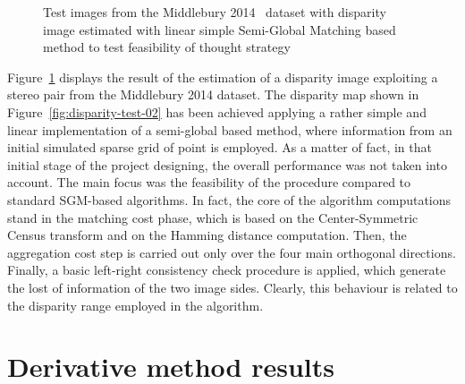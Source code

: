 \begin{figure}[t]
	\centering
\caption{Test images from the Middlebury 2014~\cite{Scharstein2014} dataset with disparity image estimated with linear simple Semi-Global Matching based method to test feasibility of thought strategy}
\label{fig:test-matlab-02}
\end{figure}

Figure~\ref{fig:test-matlab-02} displays the result of the estimation of a disparity image exploiting a stereo pair from the Middlebury 2014 dataset.
The disparity map shown in Figure~\ref{fig:disparity-test-02} has been achieved applying a rather simple and linear implementation of a semi-global based method, where information from an initial simulated sparse grid of point is employed.
As a matter of fact, in that initial stage of the project designing, the overall performance was not taken into account.
The main focus was the feasibility of the procedure compared to standard SGM-based algorithms. 
In fact, the core of the algorithm computations stand in the matching cost phase, which is based on the Center-Symmetric Census transform and on the Hamming distance computation.
Then, the aggregation cost step is carried out only over the four main orthogonal directions.
Finally, a basic left-right consistency check procedure is applied, which generate the lost of information of the two image sides.
Clearly, this behaviour is related to the disparity range employed in the algorithm.

\section{Derivative method results}
\label{section:der-method-results}

